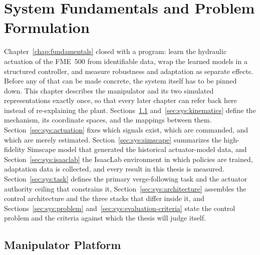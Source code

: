 \chapter{System Fundamentals and Problem Formulation}
\label{chap:system}

Chapter~\ref{chap:fundamentals} closed with a program: learn the
hydraulic actuation of the FME~500 from identifiable data, wrap the
learned models in a structured controller, and measure robustness and
adaptation as separate effects. Before any of that can be made concrete,
the system itself has to be pinned down. This chapter describes the
manipulator and its two simulated representations exactly once, so that
every later chapter can refer back here instead of re-explaining the
plant. Sections~\ref{sec:sys:platform} and~\ref{sec:sys:kinematics}
define the mechanism, its coordinate spaces, and the mappings between
them. Section~\ref{sec:sys:actuation} fixes which signals exist, which
are commanded, and which are merely estimated.
Section~\ref{sec:sys:simscape} summarizes the high-fidelity Simscape
model that generated the historical actuator-model data, and
Section~\ref{sec:sys:isaaclab} the IsaacLab environment in which
policies are trained, adaptation data is collected, and every result in
this thesis is measured. Section~\ref{sec:sys:task} defines the primary
verge-following task and the actuator authority ceiling that constrains
it, Section~\ref{sec:sys:architecture} assembles the control
architecture and the three stacks that differ inside it, and
Sections~\ref{sec:sys:problem} and~\ref{sec:sys:evaluation-criteria}
state the control problem and the criteria against which the thesis will
judge itself.

\section{Manipulator Platform}
\label{sec:sys:platform}

